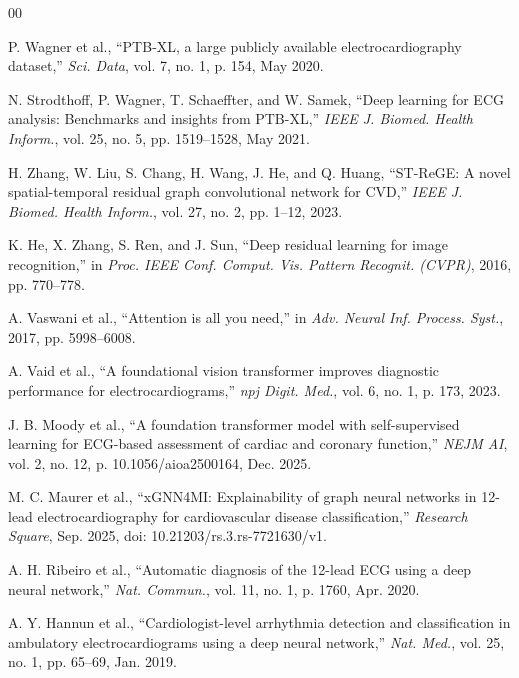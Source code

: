 \documentclass[conference]{IEEEtran}
\begin{document}
\begin{thebibliography}{00}

P. Wagner et al., ``PTB-XL, a large publicly available electrocardiography dataset,'' \textit{Sci. Data}, vol. 7, no. 1, p. 154, May 2020.

N. Strodthoff, P. Wagner, T. Schaeffter, and W. Samek, ``Deep learning for ECG analysis: Benchmarks and insights from PTB-XL,'' \textit{IEEE J. Biomed. Health Inform.}, vol. 25, no. 5, pp. 1519--1528, May 2021.

H. Zhang, W. Liu, S. Chang, H. Wang, J. He, and Q. Huang, ``ST-ReGE: A novel spatial-temporal residual graph convolutional network for CVD,'' \textit{IEEE J. Biomed. Health Inform.}, vol. 27, no. 2, pp. 1--12, 2023.

K. He, X. Zhang, S. Ren, and J. Sun, ``Deep residual learning for image recognition,'' in \textit{Proc. IEEE Conf. Comput. Vis. Pattern Recognit. (CVPR)}, 2016, pp. 770--778.

A. Vaswani et al., ``Attention is all you need,'' in \textit{Adv. Neural Inf. Process. Syst.}, 2017, pp. 5998--6008.

A. Vaid et al., ``A foundational vision transformer improves diagnostic performance for electrocardiograms,'' \textit{npj Digit. Med.}, vol. 6, no. 1, p. 173, 2023.

J. B. Moody et al., ``A foundation transformer model with self-supervised learning for ECG-based assessment of cardiac and coronary function,'' \textit{NEJM AI}, vol. 2, no. 12, p. 10.1056/aioa2500164, Dec. 2025.

M. C. Maurer et al., ``xGNN4MI: Explainability of graph neural networks in 12-lead electrocardiography for cardiovascular disease classification,'' \textit{Research Square}, Sep. 2025, doi: 10.21203/rs.3.rs-7721630/v1.

A. H. Ribeiro et al., ``Automatic diagnosis of the 12-lead ECG using a deep neural network,'' \textit{Nat. Commun.}, vol. 11, no. 1, p. 1760, Apr. 2020.

A. Y. Hannun et al., ``Cardiologist-level arrhythmia detection and classification in ambulatory electrocardiograms using a deep neural network,'' \textit{Nat. Med.}, vol. 25, no. 1, pp. 65--69, Jan. 2019.


\end{thebibliography}
\end{document}
